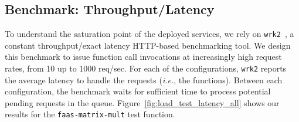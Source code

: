 \subsection{Benchmark: Throughput/Latency}
\label{sec:loadtest}
To understand the saturation point of the deployed services, we rely on \texttt{wrk2}~\cite{wrk2}, a constant throughput/exact latency HTTP-based benchmarking tool.
We design this benchmark to issue function call invocations at increasingly high request rates, from 10 up to 1000 req/sec.
For each of the configurations, \texttt{wrk2} reports the average latency to handle the requests (\emph{i.e.}, the functions).
Between each configuration, the benchmark waits for sufficient time to process potential pending requests in the queue.
Figure~\ref{fig:load_test_latency_all} shows our results for the \texttt{faas-matrix-mult} test function.

